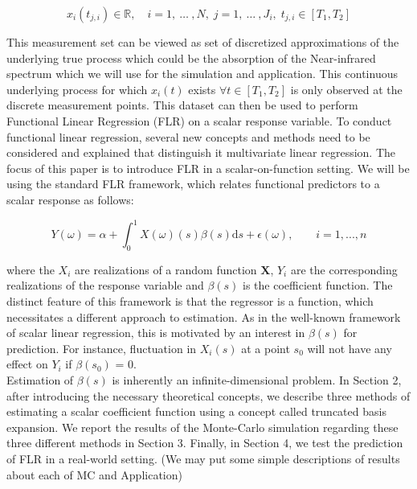 \documentclass[11pt,twoside,a4paper]{article}
\begin{document}
\begin{equation}
	x_{i}(t_{j,i}) \in \mathbb{R}, \quad i = 1,\: \dots\: ,N, \; j = 1, \: \dots \:, J_i, \; t_{j,i} \in [T_1, T_2]
\end{equation}
		
			 This measurement set can be viewed as set of discretized approximations of the underlying true process which could be the absorption of the Near-infrared spectrum which we will use for the simulation and application. This continuous underlying process for which 
 $x_i(t)$ exists $\forall t \in [T_1, T_2]$ is only observed at the discrete measurement points. This dataset can then be used to perform Functional Linear Regression (FLR) on a scalar response variable. To conduct functional linear regression, several new concepts and methods need to be considered and explained that distinguish it multivariate linear regression.
The focus of this paper is to introduce FLR in a scalar-on-function setting. We will be using the standard FLR framework, which relates functional predictors to a scalar response as follows:
	 
	 \begin{equation}
	 	Y(\omega) = \alpha + \int_{0}^{1}{X(\omega)(s)\beta(s) \mathrm{d}s} + \epsilon(\omega),
	 	\qquad i = 1, ..., n
	 \end{equation}
 
	 where the $X_{i}$ are realizations of a random function $\mathbf{X}$, $Y_i$ are the corresponding realizations of the response variable and $\beta(s)$ is the coefficient function. The distinct feature of this framework is that the regressor is a function, which necessitates a different approach to estimation. As in the well-known framework of scalar linear regression, this is motivated by an interest in $\beta(s)$ for prediction. For instance, fluctuation in $X_i(s)$ at a point $s_0$ will not have any effect on $Y_i$ if $\beta(s_0)$ = 0. \\
	 Estimation of $\beta(s)$ is inherently an infinite-dimensional problem. In Section 2, after introducing the necessary theoretical concepts, we describe three methods of estimating a scalar coefficient function using a concept called truncated basis expansion. We report the results of the Monte-Carlo simulation regarding these three different methods in Section 3. Finally, in Section 4, we test the prediction of FLR in a real-world setting. {\color{red} (We may put some simple descriptions of results about each of MC and Application)}
\end{document}
